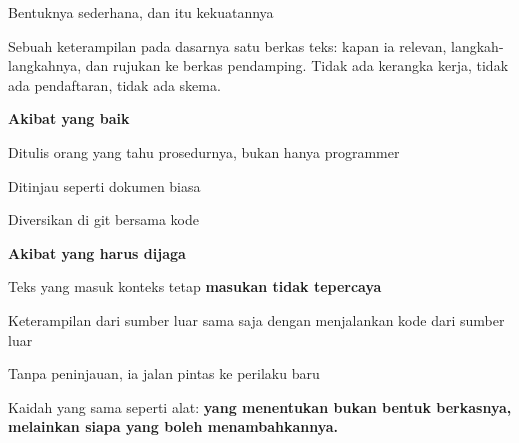 \documentclass[aspectratio=169,11pt,t]{beamer}
\begin{document}
\begin{frame}[shrink=25]{Bentuknya sederhana, dan itu kekuatannya}
{\fontsize{9.4}{12.6}\selectfont\color{fg2}Sebuah keterampilan pada dasarnya satu berkas teks: kapan ia relevan, langkah-langkahnya, dan rujukan ke berkas pendamping. Tidak ada kerangka kerja, tidak ada pendaftaran, tidak ada skema.\par}\vskip 4pt
\begin{minipage}[t]{0.485\textwidth}
{\fontsize{9.4}{12.6}\selectfont\color{fg2}\textbf{Akibat yang baik}\par}\vskip 4pt
\begin{ibullets}
\item Ditulis orang yang tahu prosedurnya, bukan hanya programmer
\item Ditinjau seperti dokumen biasa
\item Diversikan di git bersama kode
\end{ibullets}

\end{minipage}%
\hfill
\begin{minipage}[t]{0.485\textwidth}
{\fontsize{9.4}{12.6}\selectfont\color{fg2}\textbf{Akibat yang harus dijaga}\par}\vskip 4pt
\begin{ibullets}
\item Teks yang masuk konteks tetap \textbf{masukan tidak tepercaya}
\item Keterampilan dari sumber luar sama saja dengan menjalankan kode dari sumber luar
\item Tanpa peninjauan, ia jalan pintas ke perilaku baru
\end{ibullets}

\end{minipage}%
\begin{iband}[signal]
Kaidah yang sama seperti alat: \textbf{yang menentukan bukan bentuk berkasnya, melainkan siapa yang boleh menambahkannya.}
\end{iband}
\end{frame}
\end{document}
